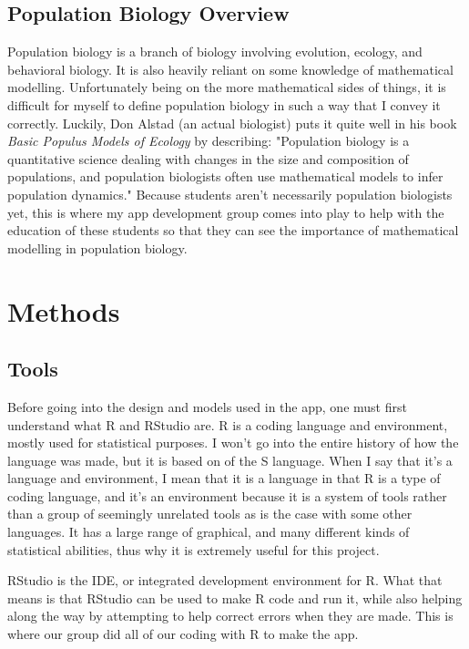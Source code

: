 \documentclass{article}\usepackage[]{graphicx}\usepackage[]{color}
\begin{document}
\subsection{Population Biology Overview}

Population biology is a branch of biology involving evolution, ecology, and behavioral biology. It is also heavily reliant on some knowledge of mathematical modelling. Unfortunately being on the more mathematical sides of things, it is difficult for myself to define population biology in such a way that I convey it correctly. Luckily, Don Alstad (an actual biologist) puts it quite well in his book \textit{Basic Populus Models of Ecology} by describing: "Population biology is a quantitative science dealing with changes in the size and composition of populations, and population biologists often use mathematical models to infer population dynamics." Because students aren't necessarily population biologists yet, this is where my app development group comes into play to help with the education of these students so that they can see the importance of mathematical modelling in population biology.




\section{Methods}



\subsection{Tools}

Before going into the design and models used in the app, one must first understand what R and RStudio are. R is a coding language and environment, mostly used for statistical purposes. I won't go into the entire history of how the language was made, but it is based on of the S language. When I say that it's a language and environment, I mean that it is a language in that R is a type of coding language, and it's an environment because it is a system of tools rather than a group of seemingly unrelated tools as is the case with some other languages. It has a large range of graphical, and many different kinds of statistical abilities, thus why it is extremely useful for this project.

RStudio is the IDE, or integrated development environment for R. What that means is that RStudio can be used to make R code and run it, while also helping along the way by attempting to help correct errors when they are made. This is where our group did all of our coding with R to make the app. 
\end{document}
